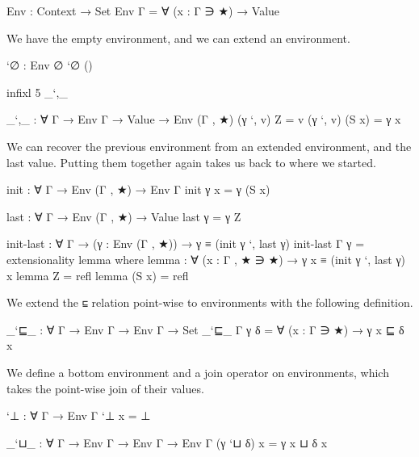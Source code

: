 \begin{fence}
\begin{code}
Env : Context → Set
Env Γ = ∀ (x : Γ ∋ ★) → Value
\end{code}
\end{fence}

We have the empty environment, and we can extend an environment.

\begin{fence}
\begin{code}
`∅ : Env ∅
`∅ ()

infixl 5 _`,_

_`,_ : ∀ {Γ} → Env Γ → Value → Env (Γ , ★)
(γ `, v) Z = v
(γ `, v) (S x) = γ x
\end{code}
\end{fence}

We can recover the previous environment from an extended environment,
and the last value. Putting them together again takes us back to where
we started.

\begin{fence}
\begin{code}
init : ∀ {Γ} → Env (Γ , ★) → Env Γ
init γ x = γ (S x)

last : ∀ {Γ} → Env (Γ , ★) → Value
last γ = γ Z

init-last : ∀ {Γ} → (γ : Env (Γ , ★)) → γ ≡ (init γ `, last γ)
init-last {Γ} γ = extensionality lemma
  where lemma : ∀ (x : Γ , ★ ∋ ★) → γ x ≡ (init γ `, last γ) x
        lemma Z      =  refl
        lemma (S x)  =  refl
\end{code}
\end{fence}

We extend the \texttt{⊑} relation point-wise to environments with the
following definition.

\begin{fence}
\begin{code}
_`⊑_ : ∀ {Γ} → Env Γ → Env Γ → Set
_`⊑_ {Γ} γ δ = ∀ (x : Γ ∋ ★) → γ x ⊑ δ x
\end{code}
\end{fence}

We define a bottom environment and a join operator on environments,
which takes the point-wise join of their values.

\begin{fence}
\begin{code}
`⊥ : ∀ {Γ} → Env Γ
`⊥ x = ⊥

_`⊔_ : ∀ {Γ} → Env Γ → Env Γ → Env Γ
(γ `⊔ δ) x = γ x ⊔ δ x
\end{code}
\end{fence}

